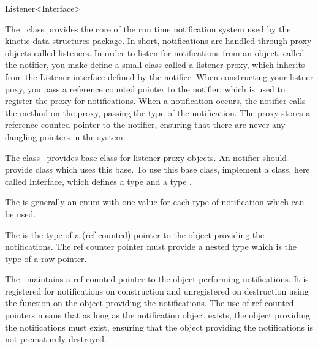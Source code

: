 

\begin{ccRefClass}{Listener<Interface>}  %


\ccDefinition
 
The \ccRefName\ class provides the core of the run time notification
system used by the kinetic data structures package. In short,
notifications are handled through proxy objects called listeners. In
order to listen for notifications from an object, called the notifier,
you make define a small class called a listener proxy, which inherits
from the Listener interface defined by the notifier. When constructing
your listner poxy, you pass a reference counted pointer to the
notifier, which is used to register the proxy for notifications. When
a notification occurs, the notifier calls the 
method on the proxy, passing the type of the notification. The proxy
stores a reference counted pointer to the notifier, ensuring that
there are never any dangling pointers in the system.

The class \ccRefName\ provides base class for listener proxy
objects. An notifier should provide class which uses this base. To use
this base class, implement a class, here called Interface, which
defines a type  and a type
.

The  is generally an enum with one value for
each type of notification which can be used.

The  is the type of a (ref counted) pointer to
the object providing the notifications. The ref counter pointer must
provide a nested type  which is the type of a raw
pointer.

The \ccRefName\ maintains a ref counted pointer to the object
performing notifications. It is registered for notifications on
construction and unregistered on destruction using the function
 on the object providing the notifications. The use
of ref counted pointers means that as long as the notification object
exists, the object providing the notifications must exist, ensuring
that the object providing the notifications is not prematurely
destroyed.


\end{ccRefClass}
